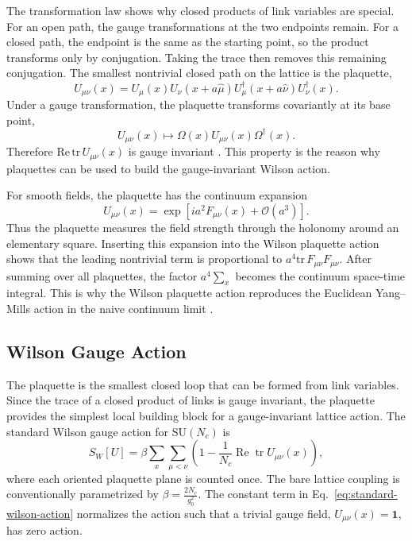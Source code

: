\documentclass[12pt,a4paper,oneside,numbers=noenddot]{scrreprt}
\newcommand{\SU}{\mathrm{SU}}
\newcommand{\order}{\mathcal{O}}
\newcommand{\latspacing}{a}
\begin{document}
The transformation law shows why closed products of link variables are special.
For an open path, the gauge transformations at the two endpoints remain. For a
closed path, the endpoint is the same as the starting point, so the product
transforms only by conjugation. Taking the trace then removes this remaining
conjugation. The smallest nontrivial closed path on the lattice is the
plaquette,
\begin{equation}
  U_{\mu\nu}(x)
  =
  U_\mu(x)
  U_\nu(x+\latspacing\hat\mu)
  U_\mu^\dagger(x+\latspacing\hat\nu)
  U_\nu^\dagger(x).
  \label{eq:plaquette-definition}
\end{equation}
Under a gauge transformation, the plaquette transforms covariantly at its base
point,
\begin{equation}
  U_{\mu\nu}(x)
  \mapsto
  \Omega(x) U_{\mu\nu}(x) \Omega^\dagger(x).
\end{equation}
Therefore \(\mathrm{Re}\,\mathrm{tr}\,U_{\mu\nu}(x)\) is gauge invariant
\cite{GattringerLang2010}. This property is the reason why plaquettes can be
used to build the gauge-invariant Wilson action.

For smooth fields, the plaquette has the continuum expansion
\begin{equation}
  U_{\mu\nu}(x)
  =
  \exp\left[
    i\latspacing^2 F_{\mu\nu}(x)
    +
    \order(\latspacing^3)
  \right].
  \label{eq:plaquette-continuum-expansion}
\end{equation}
Thus the plaquette measures the field strength through the holonomy around an
elementary square. Inserting this expansion into the Wilson plaquette action
shows that the leading nontrivial term is proportional to
\(\latspacing^4 \mathrm{tr}\,F_{\mu\nu}F_{\mu\nu}\). After summing over all
plaquettes, the factor \(\latspacing^4\sum_x\) becomes the continuum
space-time integral. This is why the Wilson plaquette action reproduces the
Euclidean Yang--Mills action in the naive continuum limit
\cite{Wilson1974,GattringerLang2010}.

\subsection{Wilson Gauge Action}
\label{subsec:wilson-gauge-action}

The plaquette is the smallest closed loop that can be formed from link
variables. Since the trace of a closed product of links is gauge invariant, the
plaquette provides the simplest local building block for a gauge-invariant
lattice action. The standard Wilson gauge action for \(\SU(N_c)\) is
\begin{equation}
  S_W[U]
  =
  \beta
  \sum_x
  \sum_{\mu<\nu}
  \left(
    1
    -
    \frac{1}{N_c}
    \operatorname{Re}\operatorname{tr}
    U_{\mu\nu}(x)
  \right),
  \label{eq:standard-wilson-action}
\end{equation}
where each oriented plaquette plane is counted once. The bare lattice coupling
is conventionally parametrized by \(\beta = \frac{2N_c}{g_0^2}.\)
The constant term in Eq.~\eqref{eq:standard-wilson-action} normalizes the
action such that a trivial gauge field, \(U_{\mu\nu}(x)=\mathbf{1}\), has zero
action.
\end{document}
